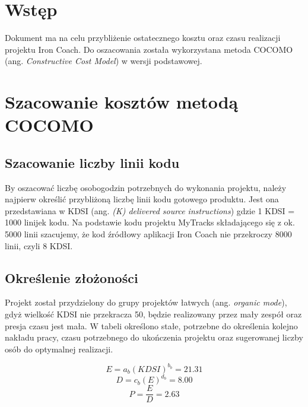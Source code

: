 


\tableofcontents
\clearpage
\section{Wstęp}
Dokument ma na celu przybliżenie ostatecznego kosztu oraz czasu realizacji projektu Iron Coach. Do oszacowania została wykorzystana metoda COCOMO (ang. \textit{Constructive Cost Model}) w wersji podstawowej.

\section{Szacowanie kosztów metodą COCOMO}
\subsection{Szacowanie liczby linii kodu}
By oszacować liczbę osobogodzin potrzebnych do wykonania projektu, należy najpierw określić przybliżoną liczbę linii kodu gotowego produktu. Jest ona przedstawiana w KDSI (ang. \textit{(K) delivered source instructions}) gdzie 1 KDSI = 1000 linijek kodu. Na podstawie kodu projektu MyTracks składającego się z ok. 5000 linii szacujemy, że kod źródłowy aplikacji Iron Coach nie przekroczy 8000 linii, czyli 8 KDSI.

\subsection{Określenie złożoności}
Projekt został przydzielony do grupy projektów łatwych (ang. \textit{organic mode}), gdyż wielkość KDSI nie przekracza 50, będzie realizowany przez mały zespół oraz presja czasu jest mała. W tabeli określono stałe, potrzebne do określenia kolejno nakładu pracy, czasu potrzebnego do ukończenia projektu oraz sugerowanej liczby osób do optymalnej realizacji. 

\begin{equation}\label{Nakład pracy w osobomiesiącach}
E = a_b(KDSI)^{b_b} = 21.31
\end{equation}
\begin{equation}\label{Czas potrzebny do ukończenia projektu}
D = c_b(E)^{d_b} = 8.00
\end{equation}
\begin{equation}\label{Sugerowana liczba osób}
P = \frac{E}{D} = 2.63
\end{equation}

